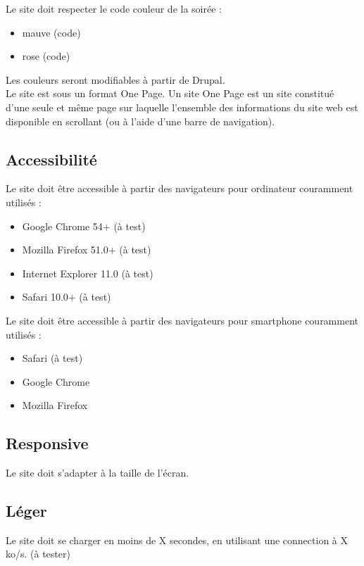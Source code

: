 \documentclass[11pt]{report}
\begin{document}
Le site doit respecter le code couleur de la soirée :
\begin{itemize}
	\item mauve (code)
	\item rose  (code)
\end{itemize}
Les couleurs seront modifiables à partir de Drupal. \\

Le site est sous un format One Page. Un site One Page est un site constitué
d'une seule et même page sur laquelle l'ensemble des informations du site web
est disponible en scrollant (ou à l'aide d'une barre de navigation).

\subsection*{Accessibilité}

Le site doit être accessible à partir des navigateurs pour ordinateur
couramment utilisés :
\begin{itemize}
	\item Google Chrome 54+ (à test)
	\item Mozilla Firefox 51.0+ (à test)
	\item Internet Explorer 11.0 (à test)
	\item Safari 10.0+ (à test)
\end{itemize}

Le site doit être accessible à partir des navigateurs pour smartphone
couramment utilisés :
\begin{itemize}
	\item Safari (à test)
	\item Google Chrome
	\item Mozilla Firefox
\end{itemize}

\subsection*{Responsive}
Le site doit s'adapter à la taille de l'écran.

\subsection*{Léger}
Le site doit se charger en moins de X secondes, en utilisant une connection à
X ko/s. (à tester)

\end{document}
